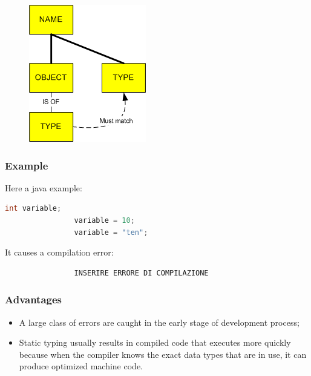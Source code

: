 \documentclass[12pt]{article}
\begin{document}
		\begin{figure}[h!]
			\centering
			\includegraphics[scale=0.60]{img/static.png}
		\end{figure}
	
		\subsubsection{Example}	
			Here a java example: 
			\begin{lstlisting}[language=Java]
				int variable;
				variable = 10;
				variable = "ten";
			\end{lstlisting}
			It causes a compilation error:
			\begin{lstlisting}
				INSERIRE ERRORE DI COMPILAZIONE
			\end{lstlisting}
			
		\subsubsection{Advantages}
			\begin{itemize}
				\item  A large class of errors are caught in the early stage of development process;
				\item Static typing usually results in compiled code that executes more quickly because when the compiler knows the exact data types that are in use, it can produce optimized machine code.
			\end{itemize}
			
\end{document}
